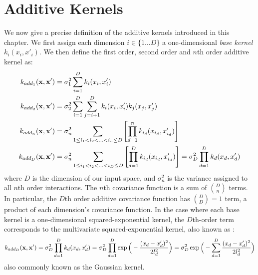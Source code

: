

\section{Additive Kernels}

We now give a precise definition of the additive kernels introduced in this chapter.
We first assign each dimension $i \in \{1 \dots D\}$ a one-dimensional \emph{base kernel} $k_i(x_i, x'_i)$.
We then define the first order, second order and $n$th order additive kernel as:
%
\begin{align}
k_{add_1}({\bf x, x'}) & = \sigma_1^2 \sum_{i=1}^D k_i(x_i, x_i') \\
k_{add_2}({\bf x, x'}) & = \sigma_2^2 \sum_{i=1}^D \sum_{j = i + 1}^D k_i(x_i, x_i') k_j(x_j, x_j') \\
k_{add_n}({\bf x, x'}) & = \sigma_n^2 \sum_{1 \leq i_1 < i_2 < ... < i_n \leq D} \left[ \prod_{d=1}^n k_{i_d}(x_{i_d}, x_{i_d}') \right] \\
k_{add_D}({\bf x, x'}) & = \sigma_n^2 \sum_{1 \leq i_1 < i_2 < ... < i_D \leq D} \left[ \prod_{d=1}^D k_{i_d}(x_{i_d}, x_{i_d}') \right] = \sigma_D^2 \prod_{d=1}^D k_{d}(x_{d}, x_{d}')
\end{align}
%
where $D$ is the dimension of our input space, and $\sigma_n^2$ is the variance assigned to all $n$th order interactions.
The $n$th covariance function is a sum of ${D \choose n}$ terms.
In particular, the $D$th order additive covariance function has ${D \choose D} = 1$ term, a product of each dimension's covariance function.
In the case where each base kernel is a one-dimensional squared-exponential kernel, the $D$th-order term corresponds to the multivariate squared-exponential kernel, also known as \seard{}:
%
\begin{align}
k_{add_D}({\bf x, x'}) = \sigma_D^2 \prod_{d=1}^D k_{d}(x_{d}, x_{d}') = \sigma_D^2 \prod_{d=1}^D \exp \Big( -\frac{ ( x_{d} - x_{d}')^2}{2l^2_d} \Big) = \sigma_D^2  \exp \Big( -\sum_{d=1}^D \frac{ ( x_{d} - x_{d}')^2}{2l^2_d} \Big)
\end{align}
%
also commonly known as the Gaussian kernel.

